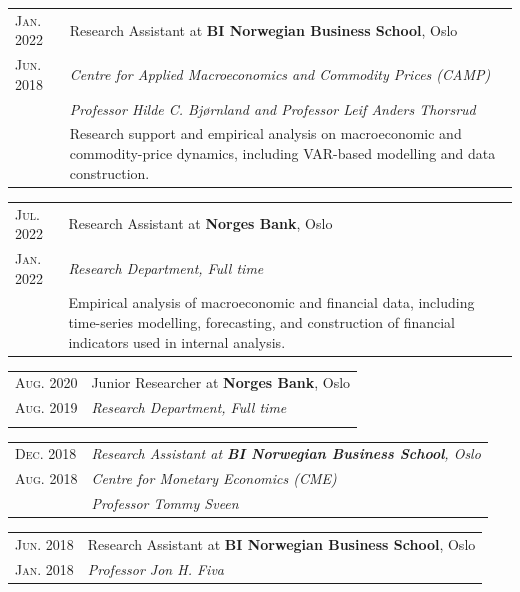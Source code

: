 \documentclass[a4paper,15pt]{article}
\begin{document}
\begin{tabular}{p{2.4cm} | p{12.9cm} }
  \small{\textsc{Jan. 2022}} & Research Assistant at \textbf{BI Norwegian Business School}, Oslo\\
  \small{\textsc{Jun. 2018}}& \emph{Centre for Applied Macroeconomics and Commodity Prices (CAMP)}\\
  &\emph{Professor Hilde C. Bjørnland and Professor Leif Anders Thorsrud}\\
  & \footnotesize{Research support and empirical analysis on macroeconomic and commodity-price dynamics, including VAR-based modelling and data construction.}
   \end{tabular}

   \begin{tabular}{p{2.4cm} | p{12.9cm} }
 \small{\textsc{Jul. 2022}} & Research Assistant at \textbf{Norges Bank}, Oslo\\
  \small{\textsc{Jan. 2022}}& \emph{Research Department, Full time}\\
& \footnotesize{Empirical analysis of macroeconomic and financial data, including time-series modelling, forecasting, and construction of financial indicators used in internal analysis.}

     \end{tabular}
     \begin{tabular}{p{2.4cm} | p{12.9cm} }
 \small{\textsc{Aug. 2020}} & Junior Researcher at \textbf{Norges Bank}, Oslo \\\small{\textsc{Aug. 2019}}&\emph{Research Department, Full time}\\\multicolumn{2}{c}{} \\
\end{tabular}

   \begin{tabular}{p{2.4cm} | p{12.9cm} }
  \small{\textsc{Dec. 2018}}&\emph{Research Assistant at \textbf{BI Norwegian Business School}, Oslo} \\ \small{\textsc{Aug. 2018}} & \emph{Centre for Monetary Economics (CME)}\\ & \emph{Professor Tommy Sveen}
 \end{tabular}


    \begin{tabular}{p{2.4cm} | p{12.9cm} }
 \small{\textsc{Jun. 2018}} & Research Assistant at \textbf{BI Norwegian Business School}, Oslo\\
\small{\textsc{Jan. 2018}} &\emph{Professor Jon H. Fiva}
\end{tabular}\\
\end{document}
